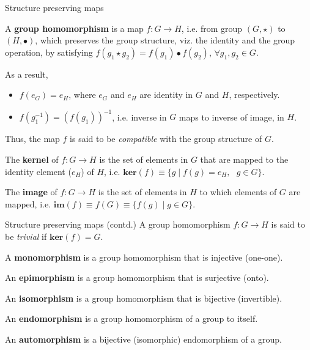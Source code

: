 \documentclass{beamer}
\newcommand\boldtext[1]{\textcolor{bolds}{\textbf{#1}}}
\newcommand\italictext[1]{\textcolor{italics}{\textit{#1}}}
\begin{document}
\begin{frame}{Structure preserving maps}
    \begin{definition}
        A \boldtext{group homomorphism} is a map $f:G\xrightarrow{}H$, i.e. from group $(G,\star)$ to $(H,\bullet)$, which preserves the group structure, viz. the identity and the group operation, by satisfying $f(g_1\star g_2)=f(g_1)\bullet f(g_2)$, $\forall g_1,g_2\in G$.
    \end{definition}
    As a result,
    \begin{itemize}
        \item $f(e_G)=e_H$, where $e_G$ and $e_H$ are identity in $G$ and $H$, respectively.
        \item $f(g_1^{-1})=(f(g_1^{}))^{-1}$, i.e. inverse in $G$ maps to inverse of image, in $H$.
    \end{itemize}
    Thus, the map $f$ is said to be \italictext{compatible} with the group structure of $G$.
    \begin{definition}
        The \boldtext{kernel} of $f:G\xrightarrow{}H$ is the set of elements in $G$ that are mapped to the identity element ($e_H$) of $H$, i.e. $\mathbf{ker}(f)\equiv\{g\mid f(g)=e_H,\text{ } g\in G\}$.
    \end{definition}
    \begin{definition}
        The \boldtext{image} of $f:G\xrightarrow{}H$ is the set of elements in $H$ to which elements of $G$ are mapped, i.e. $\mathbf{im}(f)\equiv f(G)\equiv\{f(g)\mid g\in G\}$.
    \end{definition}
\end{frame}

\begin{frame}{Structure preserving maps (contd.)}
    A group homomorphism $f:G\xrightarrow{}H$ is said to be \italictext{trivial} if $\mathbf{ker}(f)=G$.
    \begin{definition}
        A \boldtext{monomorphism} is a group homomorphism that is injective (one-one).
    \end{definition}
    \begin{definition}
        An \boldtext{epimorphism} is a group homomorphism that is surjective (onto).
    \end{definition}
    \begin{definition}
        An \boldtext{isomorphism} is a group homomorphism that is bijective (invertible).
    \end{definition}
    \begin{definition}
        An \boldtext{endomorphism} is a group homomorphism of a group to itself.
    \end{definition}
    \begin{definition}
        An \boldtext{automorphism} is a bijective (isomorphic) endomorphism of a group.
    \end{definition}
\end{frame}
\end{document}
